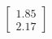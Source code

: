 \documentclass[preview]{standalone}
\begin{document}
\begin{align*}
\begin{bmatrix} 1.85 \\ 2.17 \end{bmatrix}
\end{align*}
\end{document}
